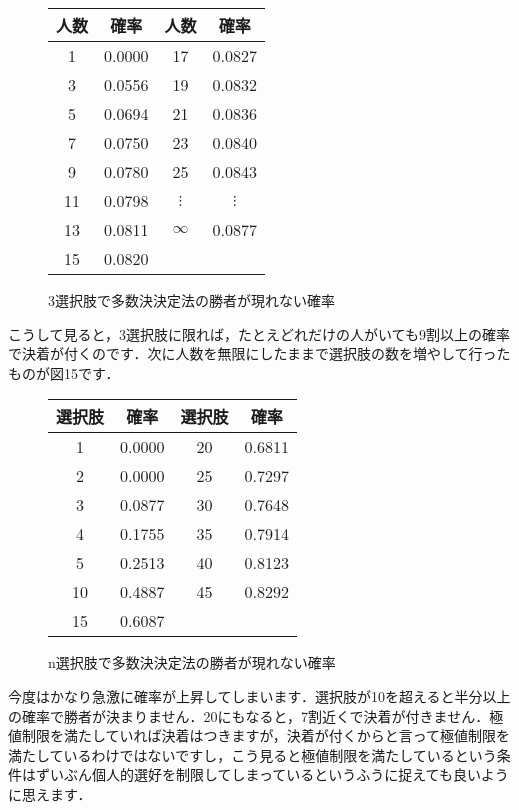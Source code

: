 \begin{figure}[!h]
    \centering
    \begin{tabular}{|cc|cc|} \hline
        人数 & 確率 & 人数 & 確率 \\ \hline 
         1 & 0.0000 & 17 & 0.0827 \\ 
         3 & 0.0556 & 19 & 0.0832 \\ 
         5 & 0.0694 & 21 & 0.0836 \\ 
         7 & 0.0750 & 23 & 0.0840 \\ 
         9 & 0.0780 & 25 & 0.0843 \\ 
        11 & 0.0798 & $\vdots$ & $\vdots$ \\
        13 & 0.0811 & $\infty$ & 0.0877 \\ 
        15 & 0.0820 & & \\ \hline
    \end{tabular}
    \caption{3選択肢で多数決決定法の勝者が現れない確率}
\end{figure}

こうして見ると，3選択肢に限れば，たとえどれだけの人がいても9割以上の確率で決着が付くのです．次に人数を無限にしたままで選択肢の数を増やして行ったものが図15です．

\begin{figure}[!h]
    \centering
    \begin{tabular}{|cc|cc|} \hline
        選択肢 & 確率   & 選択肢 & 確率 \\ \hline
        1      & 0.0000 & 20     & 0.6811 \\
        2      & 0.0000 & 25     & 0.7297 \\
        3      & 0.0877 & 30     & 0.7648 \\
        4      & 0.1755 & 35     & 0.7914 \\
        5      & 0.2513 & 40     & 0.8123 \\
        10     & 0.4887 & 45     & 0.8292 \\
        15     & 0.6087 & & \\ \hline
    \end{tabular}
    \caption{n選択肢で多数決決定法の勝者が現れない確率}
\end{figure}

今度はかなり急激に確率が上昇してしまいます．選択肢が10を超えると半分以上の確率で勝者が決まりません．20にもなると，7割近くで決着が付きません．極値制限を満たしていれば決着はつきますが，決着が付くからと言って極値制限を満たしているわけではないですし，こう見ると極値制限を満たしているという条件はずいぶん個人的選好を制限してしまっているというふうに捉えても良いように思えます．

